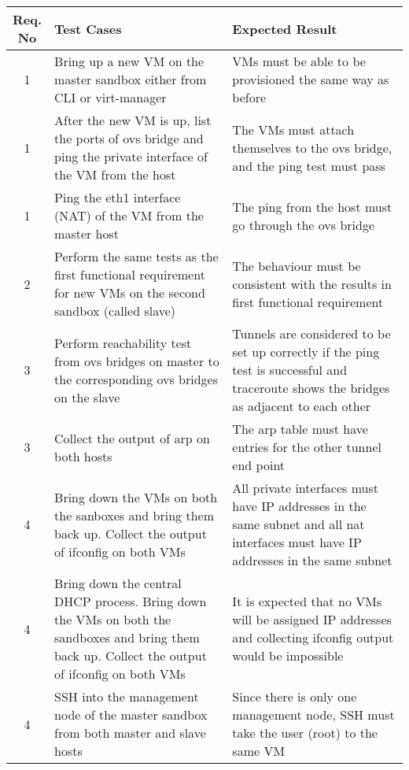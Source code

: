 \documentclass[12pt]{extarticle}
\begin{document}
\begin{center}


\begin{table}[H]
\begin{tabular}{||c  | p{0.5\linewidth} | p{0.5\linewidth} ||}
     \hline
     Req. No & Test Cases & Expected Result  \\
     \hline \hline
     1 & Bring up a new VM on the master sandbox either from CLI or virt-manager & VMs must be able to be provisioned the same way as before\\
     \hline
     1 & After the new VM is up, list the ports of ovs bridge and ping the private interface of the VM from the host & The VMs must attach themselves to the ovs bridge, and the ping test must pass \\
     \hline
     1 & Ping the eth1 interface (NAT) of the VM from the master host & The ping from the host must go through the ovs bridge \\
     \hline
     2 & Perform the same tests as the first functional requirement for new VMs on the second sandbox (called slave) & The behaviour must be consistent with the results in first functional requirement \\
     \hline
     3 & Perform reachability test from ovs bridges on master to the corresponding ovs bridges on the slave & Tunnels are considered to be set up correctly if the ping test is successful and traceroute shows the bridges as adjacent to each other \\
     \hline
     3 & Collect the output of arp on both hosts & The arp table must have entries for the other tunnel end point \\
    
     \hline
     4 & Bring down the VMs on both the sanboxes and bring them back up. Collect the output of ifconfig on both VMs & All private interfaces must have IP addresses in the same subnet and all nat interfaces must have IP addresses in the same subnet \\
     \hline
     4 & Bring down the central DHCP process. Bring down the VMs on both the sandboxes and bring them back up. Collect the output of ifconfig on both VMs & It is expected that no VMs will be assigned IP addresses and collecting ifconfig output would be impossible \\
     \hline
     4 & SSH into the management node of the master sandbox from both master and slave hosts & Since there is only one management node, SSH must take the user (root) to the same VM \\
      

\end{tabular}
\end{table}
\end{center}
\end{document}
